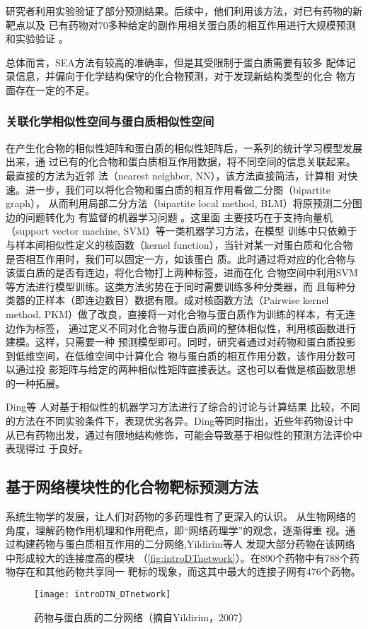 研究者利用实验验证了部分预测结果。后续中，他们利用该方法，对已有药物的新靶点以及
已有药物对70多种给定的副作用相关蛋白质的相互作用进行大规模预测和实验验证
\cite{keiser2009predicting,lounkine2012large}。

总体而言，SEA方法有较高的准确率，但是其受限制于蛋白质需要有较多
配体记录信息，并偏向于化学结构保守的化合物预测，对于发现新结构类型的化合
物方面存在一定的不足\cite{yabuuchi2011analysis}。
\subsubsection{关联化学相似性空间与蛋白质相似性空间}
在产生化合物的相似性矩阵和蛋白质的相似性矩阵后，一系列的统计学习模型发展出来，通
过已有的化合物和蛋白质相互作用数据，将不同空间的信息关联起来。最直接的方法为近邻
法（nearest neighbor, NN）\cite{bleakley2009supervised}，该方法直接简洁，计算相
对快速。进一步，我们可以将化合物和蛋白质的相互作用看做二分图（bipartite graph），
从而利用局部二分方法（bipartite local method, BLM）将原预测二分图边的问题转化为
有监督的机器学习问题
\cite{bleakley2007supervised,bleakley2009supervised,mordelet2008sirene}。这里面
主要技巧在于支持向量机（support vector machine, SVM）等一类机器学习方法，在模型
训练中只依赖于与样本间相似性定义的核函数\cite{suykens1999least}（kernel
function），当针对某一对蛋白质和化合物是否相互作用时，我们可以固定一方，如该蛋白
质。此时通过将对应的化合物与该蛋白质的是否有连边，将化合物打上两种标签，进而在化
合物空间中利用SVM等方法进行模型训练。这类方法劣势在于同时需要训练多种分类器，而
且每种分类器的正样本（即连边数目）数据有限。成对核函数方法\cite{jacob2008protein}（Pairwise kernel
method, PKM）做了改良，直接将一对化合物与蛋白质作为训练的样本，有无连边作为标签，
通过定义不同对化合物与蛋白质间的整体相似性，利用核函数进行建模。这样，只需要一种
预测模型即可。同时，研究者通过对药物和蛋白质投影到低维空间，在低维空间中计算化合
物与蛋白质的相互作用分数\cite{gonen2012predicting}，该作用分数可以通过投
影矩阵与给定的两种相似性矩阵直接表达。这也可以看做是核函数思想的一种拓展。

Ding等
人\cite{ding2014similarity}对基于相似性的机器学习方法进行了综合的讨论与计算结果
比较，不同的方法在不同实验条件下，表现优劣各异。Ding等同时指出，近些年药物设计中
从已有药物出发，通过有限地结构修饰，可能会导致基于相似性的预测方法评价中表现得过
于良好。
\subsection{基于网络模块性的化合物靶标预测方法}
系统生物学的发展，让人们对药物的多药理性有了更深入的认识\cite{pei2014systems}。
从生物网络的角度，理解药物作用机理和作用靶点，即“网络药理学”的观念，逐渐得重
视\cite{hopkins2008network}。通过构建药物与蛋白质相互作用的二分网络,Yildirim等人
\cite{yildirim2007drug}发现大部分药物在该网络中形成较大的连接度高的模块
（\autoref{fig:introDTnetwork}）。在890个药物中有788个药物存在和其他药物共享同一
靶标的现象，而这其中最大的连接子网有476个药物。
\begin{figure}[htb]
  \centering
  \texttt{[image: introDTN\_DTnetwork]}
  \caption{药物与蛋白质的二分网络（摘自Yildirim，2007）\cite{yildirim2007drug}}
  \label{fig:introDTnetwork}
\end{figure}

